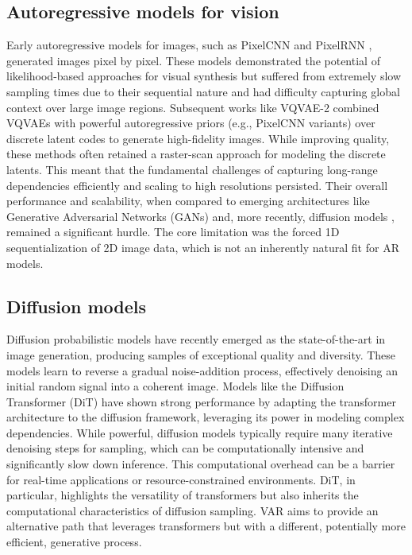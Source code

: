 \documentclass{article}
\begin{document}
\subsection{Autoregressive models for vision}
Early autoregressive models for images, such as PixelCNN \cite{oord2016conditional} and PixelRNN \cite{oord2016pixel}, generated images pixel by pixel. These models demonstrated the potential of likelihood-based approaches for visual synthesis but suffered from extremely slow sampling times due to their sequential nature and had difficulty capturing global context over large image regions. Subsequent works like VQVAE-2 \cite{razavi2019generating} combined VQVAEs \cite{van2017neural} with powerful autoregressive priors (e.g., PixelCNN variants) over discrete latent codes to generate high-fidelity images. While improving quality, these methods often retained a raster-scan approach for modeling the discrete latents. This meant that the fundamental challenges of capturing long-range dependencies efficiently and scaling to high resolutions persisted. Their overall performance and scalability, when compared to emerging architectures like Generative Adversarial Networks (GANs) \cite{goodfellow2014generative} and, more recently, diffusion models \cite{ho2020denoising, song2020score}, remained a significant hurdle. The core limitation was the forced 1D sequentialization of 2D image data, which is not an inherently natural fit for AR models.

\subsection{Diffusion models}
Diffusion probabilistic models \cite{sohl2015deep, ho2020denoising} have recently emerged as the state-of-the-art in image generation, producing samples of exceptional quality and diversity. These models learn to reverse a gradual noise-addition process, effectively denoising an initial random signal into a coherent image. Models like the Diffusion Transformer (DiT) \cite{peebles2023scalable} have shown strong performance by adapting the transformer architecture to the diffusion framework, leveraging its power in modeling complex dependencies. While powerful, diffusion models typically require many iterative denoising steps for sampling, which can be computationally intensive and significantly slow down inference. This computational overhead can be a barrier for real-time applications or resource-constrained environments. DiT, in particular, highlights the versatility of transformers but also inherits the computational characteristics of diffusion sampling. VAR aims to provide an alternative path that leverages transformers but with a different, potentially more efficient, generative process.
\end{document}
